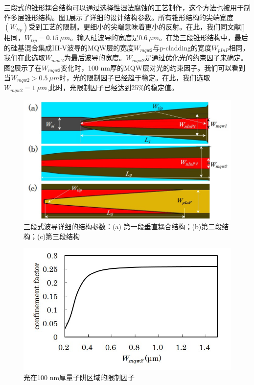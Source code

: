 三段式的锥形耦合结构可以通过选择性湿法腐蚀的工艺制作，这个方法也被用于制作多层锥形结构\cite{kurczveil2013characterization}。图\ref{fig_ch3_detail_structure}展示了详细的设计结构参数。所有锥形结构的尖端宽度$(W_{tip})$受到工艺的限制。更细小的尖端意味着更小的反射。在此，我们同文献[]相同，$W_{tip} = 0.15~\mu m$。输入硅波导的宽度是$0.6~\mu m$。在第三段锥形结构中，最后的硅基混合集成III-V波导的MQW层的宽度$W_{mqw2}$与p-cladding的宽度$W_{pInP}$相同，我们在此选取$W_{mqw2}$为最后波导的宽度。$W_{mqw2}$是通过优化光的约束因子来确定。图\ref{fig_ch3_confinement}展示了在$W_{mqw2}$变化时，100 nm厚的MQW层对光的约束因子。我们可以看到当$W_{mqw2} > 0.5~\mu m$时，光的限制因子已经趋于稳定。在此，我们选取$W_{mqw2} = 1 ~\mu m$,此时，光限制因子已经达到25\%的稳定值。

\begin{figure}[htb]
	\centering
	\includegraphics[width=12cm]{./Pictures/fig_ch3_detail_structure.jpg}
	\caption{三段式波导详细的结构参数：(a) 第一段垂直耦合结构；(b)第二段结构；(c)第三段结构}
	\label{fig_ch3_detail_structure}
\end{figure}

\begin{figure}[htb]
	\centering
	\includegraphics[width=12cm]{./Pictures/fig_ch3_confinement.jpg}
	\caption{光在100 nm厚量子阱区域的限制因子}
	\label{fig_ch3_confinement}
\end{figure}

